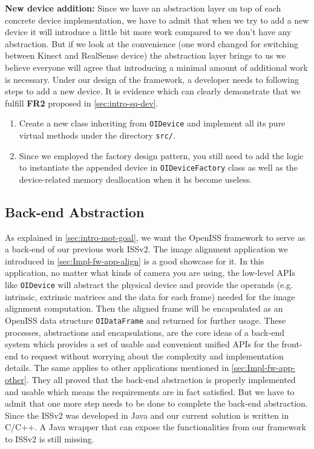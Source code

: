 \textbf{New device addition:} Since we have an abstraction layer on top of each
concrete device implementation, we have to admit that when we try to add a new
device it will introduce a little bit more work compared to we don't have any
abstraction. But if we look at the convenience (one word changed for switching 
between Kinect and RealSense device) 
the abstraction layer brings to us we believe everyone will agree that introducing 
a minimal amount of additional work is necessary. 
Under our design of the framework, a developer needs to following steps to add a 
new device. It is evidence which can clearly demonstrate that we fulfill
\textbf{FR2} proposed in \autoref{sec:intro-sq-dev}.

\begin{enumerate}
    \item Create a new class inheriting from \texttt{OIDevice} and implement all
    its pure virtual methods under the directory \texttt{src/}.
    \item Since we employed the factory design pattern, you still need to add
    the logic to instantiate the appended device in \texttt{OIDeviceFactory}
    class as well as the device-related memory deallocation when it hs become useless.
\end{enumerate}

\subsection{Back-end Abstraction}
\label{sec:Eval-framework-backend}

As explained in \autoref{sec:intro-mot-goal}, 
we want the OpenISS framework to serve
as a back-end of our previous work ISSv2. The image alignment application we
introduced in \autoref{sec:Impl-fw-app-align} is a good showcase for it. In this
application,  no matter what kinds of camera you are using,
the low-level APIs like \texttt{OIDevice} will abstract the physical
device and provide the operands (e.g. intrinsic, extrinsic matrices and the data
for each frame) needed for the image alignment computation. Then the aligned
frame will be encapsulated as an OpenISS data structure \texttt{OIDataFrame}
and returned for further usage.
These processes, abstractions and encapsulations, are the core ideas of a
back-end system which provides a set of usable and convenient unified APIs for
the front-end to request without worrying about the complexity and
implementation details. The same applies to other applications mentioned in
\autoref{sec:Impl-fw-app-other}. They all proved that the back-end abstraction
is properly implemented and usable which means the requirements are
in fact satisfied.
But we have to admit that one more step needs to be done to
complete the back-end abstraction. Since the ISSv2 was developed in Java and
our current solution is written in C/C++. A Java wrapper that can expose the
functionalities from our framework to ISSv2 is still missing.

